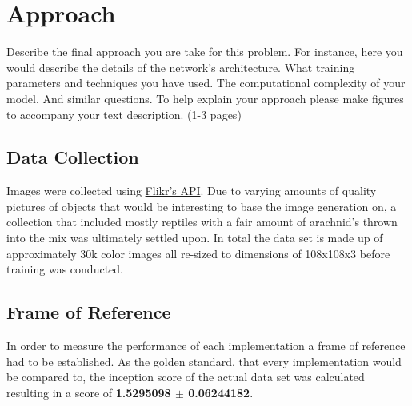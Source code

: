 
\section{Approach}

Describe the final approach you are take for this problem.
For instance, here you would describe the details of the network’s
architecture. What training parameters and techniques you have used.
The computational complexity of your model. And similar questions.
To help explain your approach please make figures to accompany your
text description. (1-3 pages)

\subsection{Data Collection}
Images were collected using \href{https://www.flickr.com/services/api/}{Flikr's API}. Due to varying amounts of quality pictures of objects that would be interesting to base the image generation on, a collection that included mostly reptiles with a fair amount of arachnid's thrown into the mix was ultimately settled upon. In total the data set is made up of approximately 30k color images all re-sized to dimensions of 108x108x3 before training was conducted. 


\subsection{Frame of Reference}
In order to measure the performance of each implementation a frame of reference had to be established. As the golden standard, that every implementation would be compared to, the inception score of the actual data set was calculated resulting in a score of \textbf{1.5295098 $\pm$ 0.06244182}.

